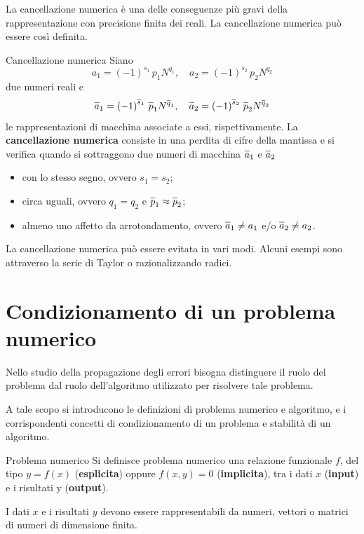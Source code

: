 La cancellazione numerica è una delle conseguenze più gravi della rappresentazione con
precisione finita dei reali. La cancellazione numerica può essere così definita.
\begin{definition}{Cancellazione numerica}
    Siano
    \[a_1=\left(-1\right)^{s_1}\,p_1N^{q_1},\quad a_2=\left(-1\right)^{s_2}\,p_2N^{q_2}\]
    due numeri reali e
    \[\overline{a\vphantom{\rule{0pt}{1.2ex}}}_1=\left(-1\right)^{\overline{s}_1}\,
    \overline{p\vphantom{\rule{0pt}{1.2ex}}}_1N^{\overline{q}_1},
    \quad \overline{a\vphantom{\rule{0pt}{1.2ex}}}_2=\left(-1\right)^{\overline{s}_2}\,
    \overline{p\vphantom{\rule{0pt}{1.2ex}}}_2N^{\overline{q}_2}\]
    le rappresentazioni di macchina associate a essi, rispettivamente. La \textbf{cancellazione numerica}
    consiste in una perdita di cifre della mantissa e si verifica quando si sottraggono due numeri di macchina
    $\overline{a\vphantom{\rule{0pt}{1.2ex}}}_1$ e $\overline{a\vphantom{\rule{0pt}{1.2ex}}}_2$
    \begin{itemize}
        \item con lo stesso segno, ovvero $s_1=s_2$;
        \item circa uguali, ovvero $q_1=q_2$ e $\overline{p\vphantom{\rule{0pt}{1.2ex}}}_1\approx
        \overline{p\vphantom{\rule{0pt}{1.2ex}}}_2$;
        \item almeno uno affetto da arrotondamento, ovvero $\overline{a\vphantom{\rule{0pt}{1.2ex}}}_1\ne a_1$
        e/o $\overline{a\vphantom{\rule{0pt}{1.2ex}}}_2\ne a_2$.
    \end{itemize}
\end{definition}

La cancellazione numerica può essere evitata in vari modi. Alcuni esempi sono attraverso la serie di
Taylor o razionalizzando radici.

\section{Condizionamento di un problema numerico}

Nello studio della propagazione degli errori bisogna distinguere il ruolo del problema dal ruolo
dell'algoritmo utilizzato per risolvere tale problema.

A tale scopo si introducono le definizioni di problema numerico e algoritmo, e i corrispondenti
concetti di condizionamento di un problema e stabilità di un algoritmo.
\begin{definition}{Problema numerico}
    Si definisce problema numerico una relazione funzionale $f$, del tipo $y=f(x)$ (\textbf{esplicita})
    oppure $f(x,y)=0$ (\textbf{implicita}), tra i dati $x$ (\textbf{input}) e i risultati y (\textbf{output}).

    I dati $x$ e i risultati $y$ devono essere rappresentabili da numeri, vettori o matrici di numeri
    di dimensione finita.
\end{definition}

